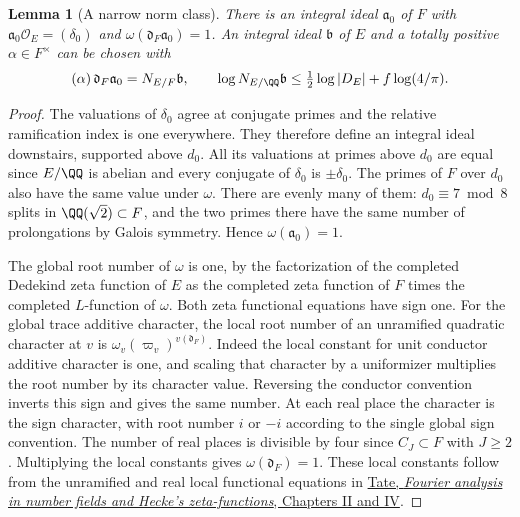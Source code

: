 \documentclass[a4paper,11pt]{article}
\newtheorem{lemma}[proposition]{Lemma}
\theoremstyle{definition}
\theoremstyle{remark}
\numberwithin{equation}{section}
\newcommand{\OO}{\mathcal O}
\begin{document}
\begin{lemma}[A narrow norm class]
\leavevmode\label{lem:norm173}
There is an integral ideal \(\mathfrak a_0\) of \(F\) with
\(\mathfrak a_0\OO_E=(\delta_0)\) and
\(\omega(\mathfrak d_F\mathfrak a_0)=1\).
An integral ideal \(\mathfrak b\) of \(E\) and a totally
positive \(\alpha\in F^\times\) can be chosen with
\begin{equation}
   (\alpha)\,\mathfrak d_F\mathfrak a_0
                 = N_{E/F}\mathfrak b,\qquad
   \log N_{E/\QQ}\mathfrak b \le \tfrac12\log|D_E|+
                                  f\log(4/\pi).             \label{eq:norm173}
\end{equation}
\end{lemma}
\begin{proof}
The valuations of \(\delta_0\) agree at conjugate primes and
the relative ramification index is one everywhere. They
therefore define an integral ideal downstairs, supported
above \(d_0\). All its valuations at primes above \(d_0\)
are equal since \(E/\QQ\) is abelian and every conjugate
of \(\delta_0\) is \(\pm\delta_0\). The primes of \(F\)
over \(d_0\) also have the same value under \(\omega\).
There are evenly many of them: \(d_0\equiv7\bmod8\) splits
in \(\QQ(\sqrt2)\subset F\), and the two primes there have
the same number of prolongations by Galois symmetry. Hence
\(\omega(\mathfrak a_0)=1\).

The global root number of \(\omega\) is one, by the
factorization of the completed Dedekind zeta function of \(E\)
as the completed zeta function of \(F\) times the completed
\(L\)-function of \(\omega\). Both zeta functional equations
have sign one. For the global trace additive character, the
local root number of an unramified quadratic character at
\(v\) is \(\omega_v(\varpi_v)^{v(\mathfrak d_F)}\).
Indeed the local constant for unit conductor additive character
is one, and scaling that character by a uniformizer multiplies
the root number by its character value. Reversing the
conductor convention inverts this sign and gives the same
number. At each real place the character is the sign
character, with root number \(i\) or \(-i\) according to the
single global sign convention. The number of real places is
divisible by four since \(C_J\subset F\) with \(J\ge2\).
Multiplying the local constants gives \(\omega(\mathfrak d_F)=1\).
These local constants follow from the unramified and real
local functional equations in
\href{https://sites.math.rutgers.edu/~alexk/2023S572/Tate1950.pdf}
{Tate, \emph{Fourier analysis in number fields and Hecke's
zeta-functions}, Chapters II and IV}.


\end{proof}
\end{document}
